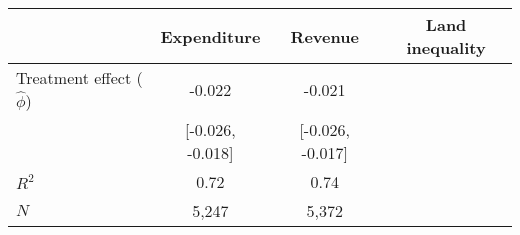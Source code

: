 	\begin{tabular}{@{}lccc@{}}
		\toprule
		& Expenditure             & Revenue                 & Land inequality \\ \midrule
		Treatment effect ($\hat{\phi}$) & -0.022  & -0.021  &            \\
										 &  [-0.026, -0.018] &  [-0.026, -0.017] &            \\
		$R^2$                           & 0.72                    & 0.74                    &            \\
		$N$                             & 5,247                   & 5,372                   &            \\ \bottomrule
	\end{tabular}
